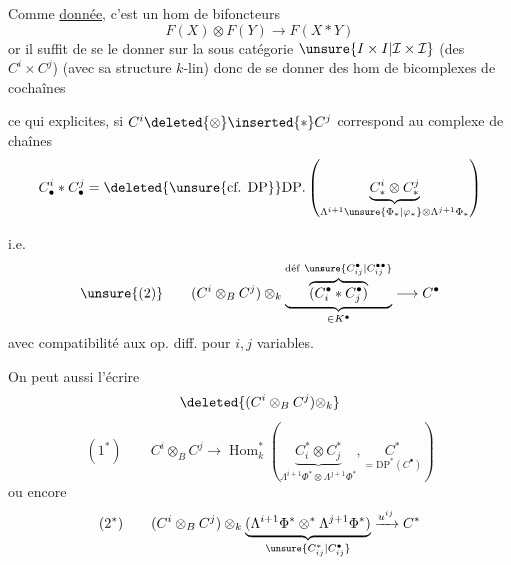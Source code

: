 Comme \uline{donnée}, c'est un hom de bifoncteurs
\[
F(X)\otimes F(Y)\longrightarrow F(X*Y)
\]
or il suffit de se le donner sur la sous catégorie  $\unsure{I\times I|\mathcal I\times\mathcal I}$  (des $C^i\times C^j$) (avec sa structure $k$-lin) donc de se donner des hom de bicomplexes de cochaînes


ce qui  explicites, si $C^i\deleted{\otimes}\inserted{*}C^j$ correspond au complexe de chaînes 
\[
C_\bullet^i*C_\bullet^j=\deleted{\unsure{\text{cf. DP}}}\mathrm{DP}.\left(\underset{\Lambda^{i+1}\unsure{\Phi_*|\varphi_*}\otimes\Lambda^{j+1}\Phi_*}{\underbrace{C_*^i\otimes C_*^j}}\right)
\]


i.e.
\[
\unsure{(2)}\qquad (C^i\otimes_B C^j)\otimes_k
\underbrace{\overbrace{(C_i^\bullet*C_j^\bullet)}^{\text{déf}\ \unsure{C_{ij}^{\bullet}|C_{ij}^{\bullet\bullet}}}}_{\in K^\bullet}
\longrightarrow C^\bullet
\]
avec compatibilité aux op. diff. pour $i,j$ variables.

On peut aussi l'écrire
\[
\deleted{(C^i\otimes_B C^j)\otimes_k}
\]
\[
(1^*)\qquad C^i\otimes_B C^j\longrightarrow
\operatorname{Hom}_k^*\left(\underbrace{C_i^*\otimes C_j^*}_{\Lambda^{i+1}\Phi^*\otimes\Lambda^{j+1}\Phi^*},\underset{=\mathrm{DP}^*(C^\bullet)}{C^*}\right)
\]
ou encore
\[
(2^*)\qquad (C^i\otimes_B C^j)\otimes_k
\underbrace{(\Lambda^{i+1}\Phi^*\otimes^*\Lambda^{j+1}\Phi^*)}_{\unsure{C_{ij}^{*}|C_{ij}^{\bullet}}}
\xrightarrow{u^{ij}}C^*
\]

